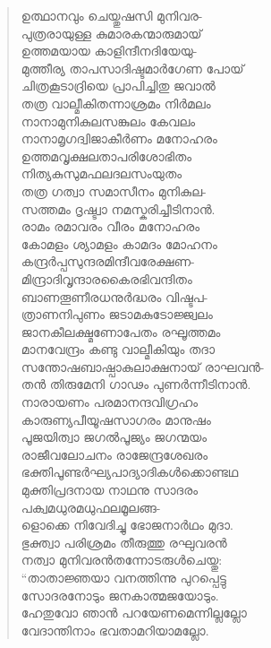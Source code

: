 \begin{verse}
ഉത്ഥാനവും ചെയ്തുഷസി മുനിവര-\\
പുത്രരായുള്ള കുമാരകന്മാരുമായ്\\
ഉത്തമയായ കാളിന്ദീനദിയേയു-\\
മുത്തീര്യ താപസാദിഷ്ടമാര്‍ഗേണ പോയ്\\
ചിത്രകൂടാദ്രിയെ പ്രാപിച്ചിതു ജവാല്‍\\
തത്ര വാല്മീകിതന്നാശ്രമം നിര്‍മലം\\
നാനാമുനികുലസങ്കുലം കേവലം\\
നാനാമൃഗദ്വിജാകീര്‍ണം മനോഹരം\\
ഉത്തമവൃക്ഷലതാപരിശോഭിതം\\
നിത്യകുസുമഫലദലസംയുതം\\
തത്ര ഗത്വാ സമാസീനം മുനികുല-\\
സത്തമം ദൃഷ്ട്വാ നമസ്കരിച്ചീടിനാന്‍.\\
രാമം രമാവരം വീരം മനോഹരം\\
കോമളം ശ്യാമളം കാമദം മോഹനം\\
കന്ദ്രര്‍പ്പസുന്ദരമിന്ദീവരേക്ഷണ-\\
മിന്ദ്രാദിവൃന്ദാരകൈരഭിവന്ദിതം\\
ബാണതൂണീരധനുര്‍ദ്ധരം വിഷ്ടപ-\\
ത്രാണനിപുണം ജടാമകുടോജ്ജ്വലം\\
ജാനകീലക്ഷ്മണോപേതം രഘൂത്തമം\\
മാനവേന്ദ്രം കണ്ടു വാല്മീകിയും തദാ\\
സന്തോഷബാഷ്പാകുലാക്ഷനായ് രാഘവന്‍-\\
തന്‍ തിരുമേനി ഗാഢം പുണര്‍ന്നീടിനാന്‍.\\
നാരായണം പരമാനന്ദവിഗ്രഹം\\
കാരുണ്യപീയൂഷസാഗരം മാനുഷം\\
പൂജയിത്വാ ജഗല്‍പൂജ്യം ജഗന്മയം\\
രാജീവലോചനം രാജേന്ദ്രശേഖരം\\
ഭക്തിപൂണ്ടര്‍ഘ്യപാദ്യാദികള്‍ക്കൊണ്ടഥ\\
മുക്തിപ്രദനായ നാഥനു സാദരം\\
പക്വമധുരമധുഫലമൂലങ്ങ-\\
ളൊക്കെ നിവേദിച്ചു ഭോജനാര്‍ഥം മുദാ.\\
ഭുക്ത്വാ പരിശ്രമം തീരുത്തു രഘുവരന്‍\\
നത്വാ മുനിവരന്‍തന്നോടരുള്‍ചെയ്തു:\\
“താതാജ്ഞയാ വനത്തിന്നു പുറപ്പെട്ടു\\
സോദരനോടും ജനകാത്മജയോടും.\\
ഹേതുവോ ഞാന്‍ പറയേണമെന്നില്ലല്ലോ\\
വേദാന്തിനാം ഭവതാമറിയാമല്ലോ.\\

\end{verse}
